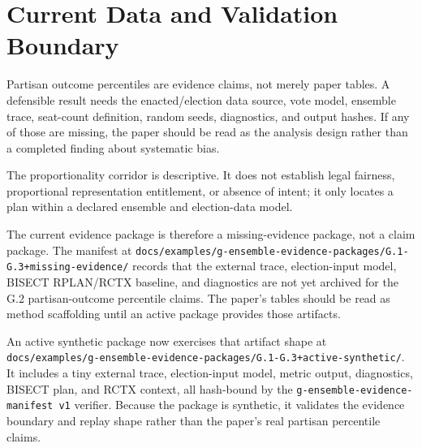 \section{Current Data and Validation Boundary}

Partisan outcome percentiles are evidence claims, not merely paper tables.  A
defensible result needs the enacted/election data source, vote model, ensemble
trace, seat-count definition, random seeds, diagnostics, and output hashes.  If
any of those are missing, the paper should be read as the analysis design rather
than a completed finding about systematic bias.

The proportionality corridor is descriptive.  It does not establish legal
fairness, proportional representation entitlement, or absence of intent; it
only locates a plan within a declared ensemble and election-data model.

The current evidence package is therefore a missing-evidence package, not a
claim package.  The manifest at
\texttt{docs/examples/g-ensemble-evidence-packages/G.1-G.3+missing-evidence/}
records that the external trace, election-input model, BISECT RPLAN/RCTX
baseline, and diagnostics are not yet archived for the G.2 partisan-outcome
percentile claims.  The paper's tables should be read as method scaffolding
until an active package provides those artifacts.

An active synthetic package now exercises that artifact shape at
\texttt{docs/examples/g-ensemble-evidence-packages/G.1-G.3+active-synthetic/}.
It includes a tiny external trace, election-input model, metric output,
diagnostics, BISECT plan, and RCTX context, all hash-bound by the
\texttt{g-ensemble-evidence-manifest v1} verifier.  Because the package is
synthetic, it validates the evidence boundary and replay shape rather than the
paper's real partisan percentile claims.
